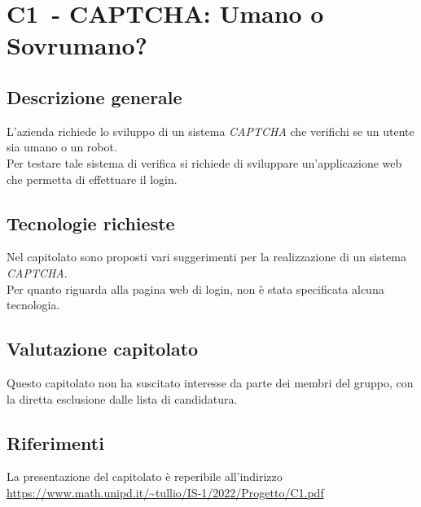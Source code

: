 
\renewcommand{\capName}{CAPTCHA: Umano o Sovrumano?} %
\renewcommand{\capCode}{C1} %
\renewcommand{\capLink}{https://www.math.unipd.it/~tullio/IS-1/2022/Progetto/C1.pdf} %
\renewcommand{\capProposer}{Zucchetti} %


\section{\capCode\ - \capName}
\subsection{Descrizione generale}
L'azienda richiede lo sviluppo di un sistema \emph{CAPTCHA} che verifichi se un utente sia umano o un robot. \\
Per testare tale sistema di verifica si richiede di sviluppare un'applicazione web che permetta di effettuare il login. 

\subsection{Tecnologie richieste}
Nel capitolato sono proposti vari suggerimenti per la realizzazione di un sistema \emph{CAPTCHA}. \\
Per quanto riguarda alla pagina web di login, non è stata specificata alcuna tecnologia.

\subsection{Valutazione capitolato}
Questo capitolato non ha suscitato interesse da parte dei membri del gruppo, con la diretta esclusione dalle lista di candidatura.

\subsection{Riferimenti}
La presentazione del capitolato è reperibile all'indirizzo \url{\capLink}